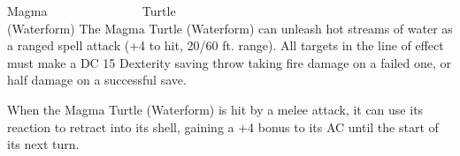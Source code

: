 \begin{DndMonster}[width=0.5\textwidth]{Magma ~~~~~~~~~~~~~~ Turtle\\(Waterform)}
	The Magma Turtle (Waterform) can unleash hot streams of water as a ranged spell attack (+4 to hit, 20/60 ft. range). All targets in the line of effect must make a DC 15 Dexterity saving throw taking  fire damage on a failed one, or half damage on a successful save.
    
    
    When the Magma Turtle (Waterform) is hit by a melee attack, it can use its reaction to retract into its shell, gaining a +4 bonus to its AC until the start of its next turn.
      
\end{DndMonster}

\vfill\eject %

